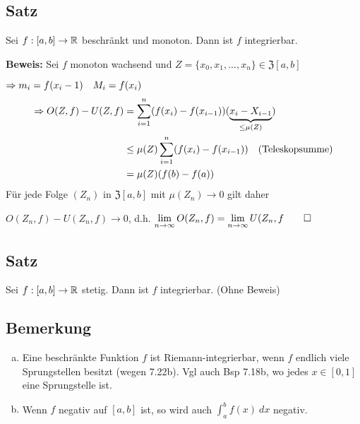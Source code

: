 \documentclass[10pt, a4paper, fleqn]{article}
\begin{document}
\subsection{Satz}
Sei $f: [a, b] \to \mathbb{R}$ beschränkt und monoton. Dann ist $f$ integrierbar.
\bigskip

\textbf{Beweis: } Sei $f$ monoton wachsend und $Z = \{x_0, x_1, ..., x_n\} \in \mathfrak{Z}[a, b]$

$\Rightarrow m_i = f(x_i - 1)\quad M_i = f(x_i)$
\[\begin{aligned}
    \Rightarrow O(Z, f) - U(Z, f) &=
    \sum_{i = 1}^n (f(x_i) - f(x_{i - 1}))(\underbrace{x_i - X_{i - 1}}_{\leq \mu(Z)}) \\
        &\leq \mu(Z) \sum_{i=1}^n (f(x_i) - f(x_{i - 1})) \quad \text{(Teleskopsumme)} \\
        &= \mu(Z)(f(b) - f(a))
\end{aligned}\]
Für jede Folge $(Z_n)$ in $\mathfrak{Z}[a, b]$ mit $\mu(Z_n) \to 0$ gilt daher

$O(Z_n, f) - U(Z_n, f) \to 0$, d.h. $\lim\limits_{n \to \infty} O(Z_n, f) = \lim\limits_{n \to \infty} U(Z_n, f \qed$

\subsection{Satz}
Sei $f: [a, b] \to \mathbb{R}$ stetig. Dann ist $f$ integrierbar. (Ohne Beweis)

\subsection{Bemerkung}
\begin{enumerate}[a)] %
    \item Eine beschränkte Funktion $f$ ist Riemann-integrierbar, wenn $f$ endlich viele Sprungstellen besitzt
    (wegen 7.22b). Vgl auch Bsp 7.18b, wo jedes $x \in [0, 1]$ eine Sprungstelle ist.
    \item Wenn $f$ negativ auf $[a, b]$ ist, so wird auch $\int_a^bf(x) \:dx$ negativ.
\end{enumerate}
\end{document}
